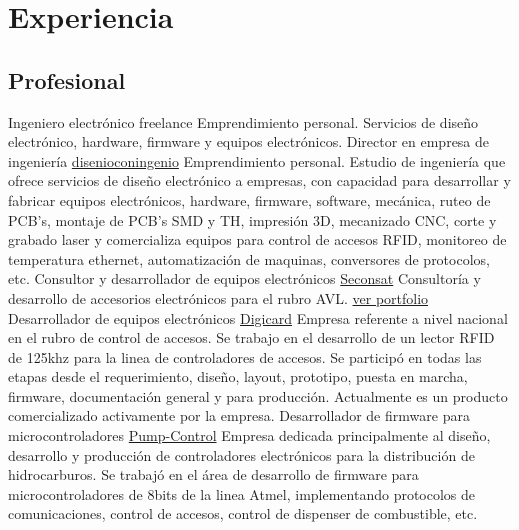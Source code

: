 \section{Experiencia}
   \subsection{\bfseries{Profesional}}
       { Ingeniero electrónico freelance}                   { } { } { } { Emprendimiento personal. Servicios de diseño electrónico, hardware, firmware y equipos electrónicos.}
           { Director en empresa de ingeniería}                 { \href { www.disenioconingenio.com.ar} { disenioconingenio}} { } { } { Emprendimiento personal. Estudio de ingeniería que ofrece servicios de diseño electrónico a empresas, con capacidad para desarrollar y fabricar equipos electrónicos, hardware, firmware, software, mecánica, ruteo de PCB's, montaje de PCB's SMD y TH, impresión 3D, mecanizado CNC, corte y grabado laser y comercializa equipos para control de accesos RFID, monitoreo de temperatura ethernet, automatización de maquinas, conversores de protocolos, etc.}
           { Consultor y desarrollador de equipos electrónicos} { \href { www.seconsat.com}             { Seconsat}}          { } { } { Consultoría y desarrollo de accesorios electrónicos para el rubro AVL. \hyperlink{subsec:seconsat}{ver portfolio}}
           { Desarrollador de equipos electrónicos}             { \href { www.digicard.com.ar}          { Digicard}}          { } { } { Empresa referente a nivel nacional en el rubro de control de accesos. Se trabajo en el desarrollo de un lector RFID de 125khz para la linea de controladores de accesos. Se participó en todas las etapas desde el requerimiento, diseño, layout, prototipo, puesta en marcha, firmware, documentación general y para producción. Actualmente es un producto comercializado activamente por la empresa.}
           { Desarrollador de firmware para microcontroladores} { \href { www.pump-control.com.ar}      { Pump-Control}}      { } { } { Empresa dedicada principalmente al diseño, desarrollo y producción de controladores electrónicos para la distribución de hidrocarburos. Se trabajó en el área de desarrollo de firmware para microcontroladores de 8bits de la linea Atmel, implementando protocolos de comunicaciones, control de accesos, control de dispenser de combustible, etc.}


